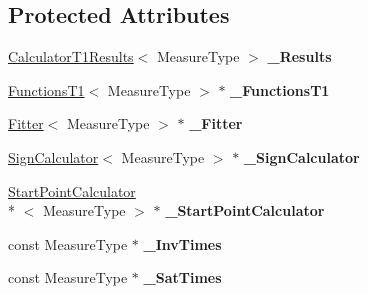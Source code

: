 \subsection*{Protected Attributes}
\begin{DoxyCompactItemize}
\item 
\hypertarget{class_ox_1_1_calculator_t1_afa4db4321ca3013a14bcbafbf2d6413a}{\hyperlink{struct_ox_1_1_calculator_t1_results}{Calculator\-T1\-Results}$<$ Measure\-Type $>$ {\bfseries \-\_\-\-Results}}\label{class_ox_1_1_calculator_t1_afa4db4321ca3013a14bcbafbf2d6413a}

\item 
\hypertarget{class_ox_1_1_calculator_t1_a3ad93308f17209680d93b727a90a23ee}{\hyperlink{class_ox_1_1_functions_t1}{Functions\-T1}$<$ Measure\-Type $>$ $\ast$ {\bfseries \-\_\-\-Functions\-T1}}\label{class_ox_1_1_calculator_t1_a3ad93308f17209680d93b727a90a23ee}

\item 
\hypertarget{class_ox_1_1_calculator_t1_a4863afe5f79555d5c6c31f6726d18578}{\hyperlink{class_ox_1_1_fitter}{Fitter}$<$ Measure\-Type $>$ $\ast$ {\bfseries \-\_\-\-Fitter}}\label{class_ox_1_1_calculator_t1_a4863afe5f79555d5c6c31f6726d18578}

\item 
\hypertarget{class_ox_1_1_calculator_t1_a6408fb35f4aeb4793bef57b491f8fa89}{\hyperlink{class_ox_1_1_sign_calculator}{Sign\-Calculator}$<$ Measure\-Type $>$ $\ast$ {\bfseries \-\_\-\-Sign\-Calculator}}\label{class_ox_1_1_calculator_t1_a6408fb35f4aeb4793bef57b491f8fa89}

\item 
\hypertarget{class_ox_1_1_calculator_t1_a6487bcc203c83566702a12a382ebe97f}{\hyperlink{class_ox_1_1_start_point_calculator}{Start\-Point\-Calculator}\\*
$<$ Measure\-Type $>$ $\ast$ {\bfseries \-\_\-\-Start\-Point\-Calculator}}\label{class_ox_1_1_calculator_t1_a6487bcc203c83566702a12a382ebe97f}

\item 
\hypertarget{class_ox_1_1_calculator_t1_ad97a2f1d28c9ffb68b9aa1f50bf85553}{const Measure\-Type $\ast$ {\bfseries \-\_\-\-Inv\-Times}}\label{class_ox_1_1_calculator_t1_ad97a2f1d28c9ffb68b9aa1f50bf85553}

\item 
\hypertarget{class_ox_1_1_calculator_t1_af163f7c758a6ed49e12977ff76fdcd7e}{const Measure\-Type $\ast$ {\bfseries \-\_\-\-Sat\-Times}}\label{class_ox_1_1_calculator_t1_af163f7c758a6ed49e12977ff76fdcd7e}


\end{DoxyCompactItemize}
